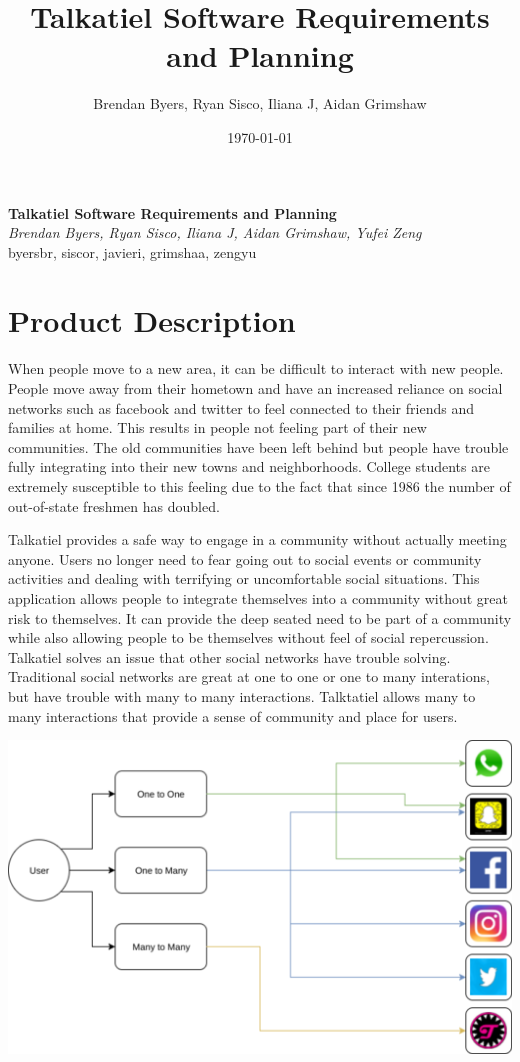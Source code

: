 \documentclass[12pt]{article}
\title{Talkatiel Software Requirements and Planning}
\author{Brendan Byers, Ryan Sisco, Iliana J, Aidan Grimshaw}
\date{\today}
\begin{document}
\begin{center}
      \Large\textbf{Talkatiel Software Requirements and Planning}\\
      \large\textit{Brendan Byers, Ryan Sisco, Iliana J, Aidan Grimshaw, Yufei Zeng}\\
      \large{byersbr, siscor, javieri, grimshaa, zengyu}\\
   \end{center}

\tableofcontents

\section{Product Description}
  When people move to a new area, it can be difficult to interact with new people.  People move away from their hometown and have an increased reliance on social networks such as facebook and twitter to feel connected to their friends and families at home.  This results in people not feeling part of their new communities.  The old communities have been left behind but people have trouble fully integrating into their new towns and neighborhoods.  College students are extremely susceptible to this feeling due to the fact that since 1986 the number of out-of-state freshmen has doubled\cite{item2}.

  Talkatiel provides a safe way to engage in a community without actually meeting anyone.  Users no longer need to fear going out to social events or community activities and dealing with terrifying or uncomfortable social situations.  This application allows people to integrate themselves into a community without great risk to themselves.  It can provide the deep seated need to be part of a community while also allowing people to be themselves without feel of social repercussion.  Talkatiel solves an issue that other social networks have trouble solving.  Traditional social networks are great at one to one or one to many interations, but have trouble with many to many interactions.  Talktatiel allows many to many interactions that provide a sense of community and place for users.

  \includegraphics[scale=0.75]{similarServices}
\end{document}
